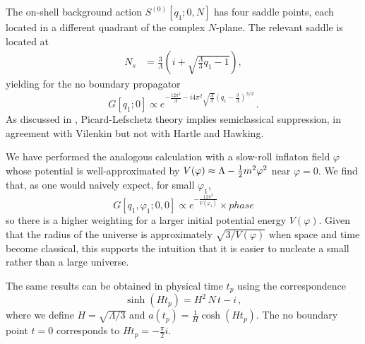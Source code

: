 \documentclass[twocolumn,amsmath,amssymb,superscriptaddress,nofootinbib]{revtex4-1}
\begin{document}
The on-shell background action $S^{(0)}[q_1;0,N]$ has four saddle points, each located in a different quadrant of the complex $N$-plane. The relevant saddle is located at
\begin{align}
N_s &= \frac{3}{\Lambda}\left(i + \sqrt{\frac{\Lambda}{3} q_1 - 1}\right),\nonumber
\end{align}
yielding for the no boundary propagator
\begin{equation}
G[q_1;0] \propto  e^{-\frac{12\pi^2}{\Lambda}   - i4\pi^2 \sqrt{\frac{\Lambda}{3}}\left(q_1-\frac{3}{\Lambda}\right)^{3/2} }\,.\nonumber
\end{equation}
As discussed in \cite{Feldbrugge:2017kzv,Feldbrugge:2017b}, Picard-Lefschetz theory implies semiclassical suppression, in agreement with Vilenkin but not with Hartle and Hawking.  

We have performed the analogous calculation with a slow-roll inflaton field $\varphi$ whose potential is well-approximated by $V(\varphi)\approx \Lambda - {1\over 2} m^2 \varphi^2$ near $\varphi=0$. We find that, as one would naively expect, for small $\varphi_1$,
\begin{equation}
G[q_1,\varphi_1;0,0] \propto  e^{-\frac{12\pi^2}{V(\varphi_1)} }\times phase \nonumber
\end{equation}
so there is a higher weighting for a larger initial potential energy $V(\varphi)$. Given that the radius of the universe is approximately $\sqrt{3/V(\varphi)}$ when space and time become classical, this supports the intuition that it is easier to nucleate a small rather than a large universe.

The same results can be obtained in physical time $t_p$ using the correspondence 
\begin{equation}
\sinh(H t_p) = H^2 \,N \,t - i\,, \label{eq:corres}
\end{equation}
where we define $H=\sqrt{\Lambda/3}$ and $a(t_p) = \frac{1}{H}\cosh\left(Ht_p\right)$. The no boundary point $t=0$ corresponds to $Ht_p = -\frac{\pi}{2}i.$ \\

\end{document}
